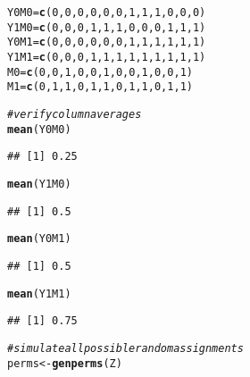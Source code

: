 \documentclass[11pt,notitlepage]{article}\usepackage[]{graphicx}\usepackage[]{color}
\makeatletter
\newcommand{\hlnum}[1]{\textcolor[rgb]{0.686,0.059,0.569}{#1}}%
\newcommand{\hlcom}[1]{\textcolor[rgb]{0.678,0.584,0.686}{\textit{#1}}}%
\newcommand{\hlstd}[1]{\textcolor[rgb]{0.345,0.345,0.345}{#1}}%
\newcommand{\hlkwb}[1]{\textcolor[rgb]{0.69,0.353,0.396}{#1}}%
\newcommand{\hlkwd}[1]{\textcolor[rgb]{0.737,0.353,0.396}{\textbf{#1}}}%
\newenvironment{kframe}{%
 \def\at@end@of@kframe{}%
 \ifinner\ifhmode%
  \def\at@end@of@kframe{\end{minipage}}%
  \begin{minipage}{\columnwidth}%
 \fi\fi%
 \def\FrameCommand##1{\hskip\@totalleftmargin \hskip-\fboxsep
 \colorbox{shadecolor}{##1}\hskip-\fboxsep
     \hskip-\linewidth \hskip-\@totalleftmargin \hskip\columnwidth}%
 \MakeFramed {\advance\hsize-\width
   \@totalleftmargin\z@ \linewidth\hsize
   \@setminipage}}%
 {\par\unskip\endMakeFramed%
 \at@end@of@kframe}
\newenvironment{knitrout}{}{} %
\makeatother
\begin{document}
\begin{enumerate}[a)]
\begin{knitrout}
\begin{kframe}
\begin{alltt}
\hlstd{Y0M0} \hlkwb{=} \hlkwd{c}\hlstd{(}\hlnum{0}\hlstd{,}\hlnum{0}\hlstd{,}\hlnum{0}\hlstd{,}\hlnum{0}\hlstd{,}\hlnum{0}\hlstd{,}\hlnum{0}\hlstd{,}\hlnum{1}\hlstd{,}\hlnum{1}\hlstd{,}\hlnum{1}\hlstd{,}\hlnum{0}\hlstd{,}\hlnum{0}\hlstd{,}\hlnum{0}\hlstd{)}
\hlstd{Y1M0} \hlkwb{=} \hlkwd{c}\hlstd{(}\hlnum{0}\hlstd{,}\hlnum{0}\hlstd{,}\hlnum{0}\hlstd{,}\hlnum{1}\hlstd{,}\hlnum{1}\hlstd{,}\hlnum{1}\hlstd{,}\hlnum{0}\hlstd{,}\hlnum{0}\hlstd{,}\hlnum{0}\hlstd{,}\hlnum{1}\hlstd{,}\hlnum{1}\hlstd{,}\hlnum{1}\hlstd{)}
\hlstd{Y0M1} \hlkwb{=} \hlkwd{c}\hlstd{(}\hlnum{0}\hlstd{,}\hlnum{0}\hlstd{,}\hlnum{0}\hlstd{,}\hlnum{0}\hlstd{,}\hlnum{0}\hlstd{,}\hlnum{0}\hlstd{,}\hlnum{1}\hlstd{,}\hlnum{1}\hlstd{,}\hlnum{1}\hlstd{,}\hlnum{1}\hlstd{,}\hlnum{1}\hlstd{,}\hlnum{1}\hlstd{)}
\hlstd{Y1M1} \hlkwb{=} \hlkwd{c}\hlstd{(}\hlnum{0}\hlstd{,}\hlnum{0}\hlstd{,}\hlnum{0}\hlstd{,}\hlnum{1}\hlstd{,}\hlnum{1}\hlstd{,}\hlnum{1}\hlstd{,}\hlnum{1}\hlstd{,}\hlnum{1}\hlstd{,}\hlnum{1}\hlstd{,}\hlnum{1}\hlstd{,}\hlnum{1}\hlstd{,}\hlnum{1}\hlstd{)}
\hlstd{M0} \hlkwb{=} \hlkwd{c}\hlstd{(}\hlnum{0}\hlstd{,}\hlnum{0}\hlstd{,}\hlnum{1}\hlstd{,}\hlnum{0}\hlstd{,}\hlnum{0}\hlstd{,}\hlnum{1}\hlstd{,}\hlnum{0}\hlstd{,}\hlnum{0}\hlstd{,}\hlnum{1}\hlstd{,}\hlnum{0}\hlstd{,}\hlnum{0}\hlstd{,}\hlnum{1}\hlstd{)}
\hlstd{M1} \hlkwb{=} \hlkwd{c}\hlstd{(}\hlnum{0}\hlstd{,}\hlnum{1}\hlstd{,}\hlnum{1}\hlstd{,}\hlnum{0}\hlstd{,}\hlnum{1}\hlstd{,}\hlnum{1}\hlstd{,}\hlnum{0}\hlstd{,}\hlnum{1}\hlstd{,}\hlnum{1}\hlstd{,}\hlnum{0}\hlstd{,}\hlnum{1}\hlstd{,}\hlnum{1}\hlstd{)}

\hlcom{# verify column averages}
\hlkwd{mean}\hlstd{(Y0M0)}
\end{alltt}
\begin{verbatim}
## [1] 0.25
\end{verbatim}
\begin{alltt}
\hlkwd{mean}\hlstd{(Y1M0)}
\end{alltt}
\begin{verbatim}
## [1] 0.5
\end{verbatim}
\begin{alltt}
\hlkwd{mean}\hlstd{(Y0M1)}
\end{alltt}
\begin{verbatim}
## [1] 0.5
\end{verbatim}
\begin{alltt}
\hlkwd{mean}\hlstd{(Y1M1)}
\end{alltt}
\begin{verbatim}
## [1] 0.75
\end{verbatim}
\begin{alltt}
\hlcom{# simulate all possible random assignments}
\hlstd{perms} \hlkwb{<-} \hlkwd{genperms}\hlstd{(Z)}


\end{alltt}
\end{kframe}
\end{knitrout}
\end{enumerate}
\end{document}
